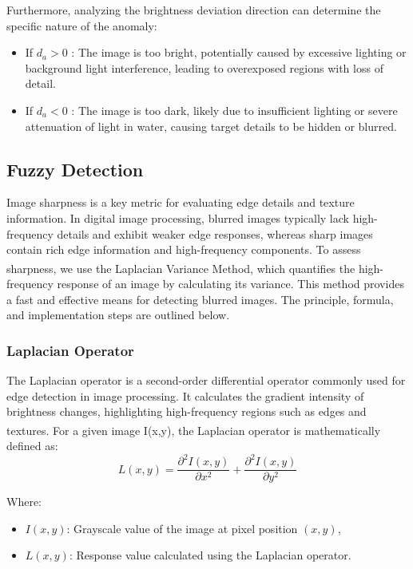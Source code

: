 \documentclass[withoutpreface,bwprint]{cumcmthesis}
\begin{document}
Furthermore, analyzing the brightness deviation direction can determine the specific nature of the anomaly:

\begin{itemize}[itemindent=2em]
    \item  If $d_a > 0$ : The image is too bright, potentially caused by excessive lighting or background light interference, leading to overexposed regions with loss of detail.

    \item  If $d_a < 0$ : The image is too dark, likely due to insufficient lighting or severe attenuation of light in water, causing target details to be hidden or blurred.
\end{itemize}

\subsection{Fuzzy Detection}

Image sharpness is a key metric for evaluating edge details and texture information. In digital image processing, blurred images typically lack high-frequency details and exhibit weaker edge responses, whereas sharp images contain rich edge information and high-frequency components. To assess sharpness, we use the Laplacian Variance Method\textsuperscript{\cite{he2005laplacian}}, which quantifies the high-frequency response of an image by calculating its variance. This method provides a fast and effective means for detecting blurred images. The principle, formula, and implementation steps are outlined below.

\subsubsection{Laplacian Operator}

The Laplacian operator is a second-order differential operator commonly used for edge detection in image processing. It calculates the gradient intensity of brightness changes, highlighting high-frequency regions such as edges and textures. For a given image I(x,y), the Laplacian operator\textsuperscript{\cite{ratcliffe1997damage}} is mathematically defined as:
\[L(x, y) = \frac{\partial^2 I(x, y)}{\partial x^2} + \frac{\partial^2 I(x, y)}{\partial y^2}\]

Where:

\begin{itemize}[itemindent=2em]
    \item $I(x, y)$: Grayscale value of the image at pixel position $(x, y)$,

    \item $L(x, y)$: Response value calculated using the Laplacian operator.
\end{itemize}
\end{document}
